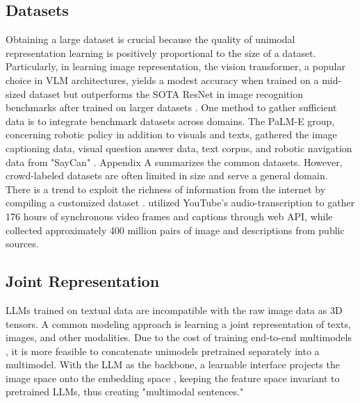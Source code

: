 \documentclass[11pt]{article}
\begin{document}
\subsection{Datasets}
Obtaining a large dataset is crucial because the quality of unimodal representation learning is positively proportional to the size of a dataset. Particularly, in learning image representation, the vision transformer, a popular choice in VLM architectures, yields a modest accuracy when trained on a mid-sized dataset but outperforms the SOTA ResNet in image recognition benchmarks after trained on larger datasets \citep{DBLP:conf/iclr/DosovitskiyB0WZ21}. One method to gather sufficient data is to integrate benchmark datasets across domains. The PaLM-E group, concerning robotic policy in addition to visuals and texts, gathered the image captioning data, visual question answer data, text corpus, and robotic navigation data from "SayCan" \citet{DBLP:conf/icml/DriessXSLCIWTVY23}. Appendix A summarizes the common datasets. However, crowd-labeled datasets are often limited in size and serve a general domain. There is a trend to exploit the richness of information from the internet by compiling a customized dataset \citep{DBLP:conf/icml/RadfordKHRGASAM21}. \citet{DBLP:conf/iccv/SunMV0S19} utilized YouTube's audio-transcription to gather 176 hours of synchronous video frames and captions through web API, while \citet{DBLP:conf/icml/RadfordKHRGASAM21} collected approximately 400 million pairs of image and descriptions from public sources. 


\subsection{Joint Representation}
LLMs trained on textual data are incompatible with the raw image data as 3D tensors. A common modeling approach is learning a joint representation of texts, images, and other modalities. Due to the cost of training end-to-end multimodels \citep{DBLP:journals/corr/abs-2306-13549}, it is more feasible to concatenate unimodels pretrained separately into a multimodel. With the LLM as the backbone, a learnable interface projects the image space onto the embedding space \citep{DBLP:journals/corr/abs-2306-13549}, keeping the feature space invariant to pretrained LLMs, thus creating "multimodal sentences." 
\end{document}

